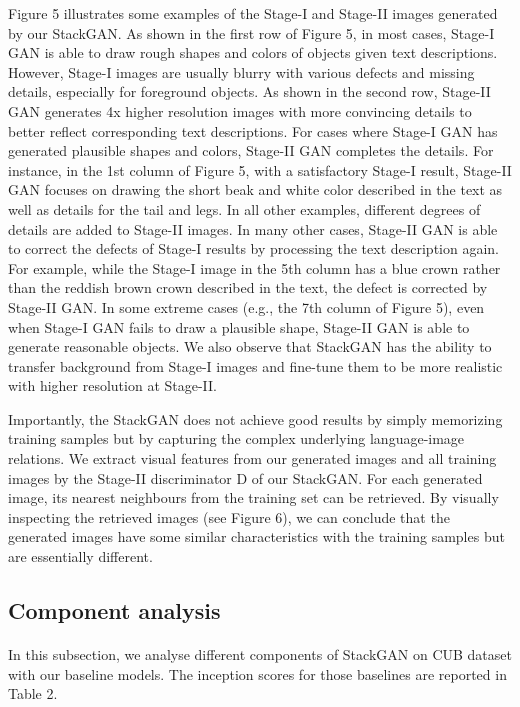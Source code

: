 \documentclass[a4paper,12pt,oneside]{article}
\begin{document}
Figure 5 illustrates some examples of the Stage-I and Stage-II images generated by our StackGAN. As shown in the first row of Figure 5, in most cases, Stage-I GAN is able to draw rough shapes and colors of objects 
given text descriptions. However, Stage-I images are usually blurry with various defects and missing details, especially for foreground objects. As shown in the second row, Stage-II GAN generates 4x higher resolution images with more convincing details to better
reflect corresponding text descriptions. For cases where Stage-I GAN has generated plausible shapes and colors, Stage-II GAN completes the details. For instance, in the 1st column of Figure 5, with a satisfactory Stage-I result, Stage-II GAN focuses on drawing 
the short beak and white color described in the text as well as details for the tail and legs. In all other examples, different degrees of details are added to Stage-II images. In many other cases, Stage-II GAN is able to correct the defects of Stage-I results by processing the text description again. For example, while the Stage-I image in the 5th column has a blue crown rather than the reddish brown crown described in the text, the defect is corrected by Stage-II GAN. In some extreme cases (e.g., the 7th column of Figure 5), even when Stage-I GAN fails to draw a plausible shape, Stage-II GAN is able to generate reasonable objects. We also observe that StackGAN has the ability to transfer background from Stage-I images and fine-tune them to be more realistic with higher resolution at Stage-II. 

Importantly, the StackGAN does not achieve good results by simply memorizing training samples but by capturing the complex underlying language-image relations. We extract visual features from our generated images and all training images by the Stage-II discriminator D of our StackGAN. For each generated image, its nearest neighbours from the training set can be retrieved. By visually inspecting the retrieved images (see Figure 6), we can conclude that the generated images have some similar characteristics with the training samples but are essentially different. 

\subsection{Component analysis}
\paragraph{}
In this subsection, we analyse different components of StackGAN on CUB dataset with our baseline models. The inception scores for those baselines are reported in Table 2. 
\end{document}
